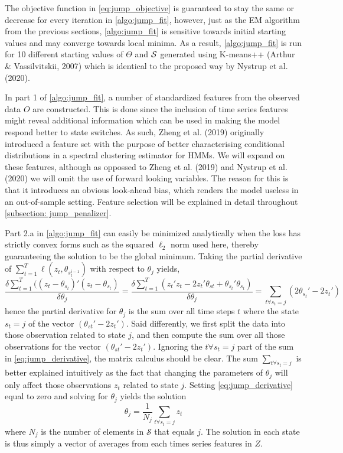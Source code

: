 The objective function in \cref{eq:jump_objective} is guaranteed to stay the same or decrease for every iteration in \cref{algo:jump_fit}, however, just as the EM algorithm from the previous sections, \cref{algo:jump_fit} is sensitive towards initial starting values and may converge towards local minima. As a result, \cref{algo:jump_fit} is run for 10 different starting values of $\Theta$ and $\S$ generated using K-means++ (Arthur \& Vassilvitskii, 2007) which is identical to the proposed way by Nystrup et al. (2020).

In part 1 of \cref{algo:jump_fit}, a number of standardized features from the observed data $O$ are constructed. This is done since the inclusion of time series features might reveal additional information which can be used in making the model respond better to state switches. As such, Zheng et al. (2019) originally introduced a feature set with the purpose of better characterising conditional distributions in a spectral clustering estimator for HMMs. We will expand on these features, although as oppossed to Zheng et al. (2019) and Nystrup et al. (2020) we will omit the use of forward looking variables. The reason for this is that it introduces an obvious look-ahead bias, which renders the model useless in an out-of-sample setting. Feature selection will be explained in detail throughout \cref{subsection: jump_penalizer}.

Part 2.a in \cref{algo:jump_fit} can easily be minimized analytically when the loss has strictly convex forms such as the squared $\ell_2$ norm used here, thereby guaranteeing the solution to be the global minimum. Taking the partial derivative of $\sum_{t=1}^T \ell(z_t, \theta_{s_t^{i-1}})$ with respect to $\theta_j$ yields,
\begin{equation}
   \frac{\delta \sum_{t=1}^{T} ((z_t-\theta_{s_t})'(z_t-\theta_{s_t}) }{\delta \theta_j}
   = \frac{\delta \sum_{t=1}^T (z_t'z_t - 2z_t'\theta_{st}+ \theta_{s_t}'\theta_{s_t} )}{\delta  \theta_j}
   = \sum_{t\forall s_t=j} ( 2\theta_{s_t}' - 2z_t' )
\label{eq:jump_derivative}
\end{equation}
hence the partial derivative for $\theta_j$ is the sum over all time steps $t$ where the state $s_t=j$ of the vector $(\theta_{st}'-2z_t')$. Said differently, we first split the data into those observation related to state $j$, and then compute the sum over all those observations for the vector $(\theta_{st}'-2z_t')$. Ignoring the $t\forall s_t=j$ part of the sum in \cref{eq:jump_derivative}, the matrix calculus should be clear. The sum $\sum_{t\forall s_t=j}$ is better explained intuitively as the fact that changing the parameters of $\theta_j$ will only affect those observations $z_t$ related to state $j$. Setting \cref{eq:jump_derivative} equal to zero and solving for $\theta_j$ yields the solution
\begin{equation}
    \theta_j = \frac{1}{N_j} \sum_{t\forall s_t=j} z_t     
\end{equation}
where $N_j$ is the number of elements in $\mathcal{S}$ that equals $j$. The solution in each state is thus simply a vector of averages from each times series features in $Z$.

